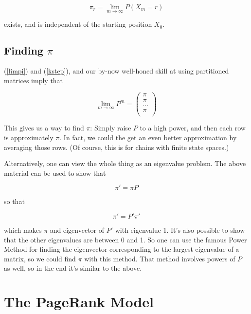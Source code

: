 \begin{equation}
\label{limpi}
\pi_r = \lim_{m \rightarrow \infty} P(X_m = r)
\end{equation}

exists, and is independent of the starting position $X_0$.

\subsection{Finding $\pi$}

(\ref{limpi}) and (\ref{kstep}), and our by-now well-honed skill at
using partitioned matrices imply that 

\begin{equation}
\lim_{m \rightarrow \infty} P^m = 
\left (
\begin{array}{r}
\pi \\
\pi \\
... \\
\pi \\
\end{array}
\right )
\end{equation}

This gives us a way to find $\pi$:  Simply raise $P$ to a high power,
and then each row is approximately $\pi$.  In fact, we could the get an
even better approximation by averaging those rows.  (Of course, this is
for chains with finite state spaces.)

Alternatively, one can view the whole thing as an eigenvalue problem.
The above material can be used to show that

\begin{equation}
\pi' = \pi P
\end{equation}

so that 

\begin{equation}
\pi' = P' \pi' 
\end{equation}

which makes $\pi$ and eigenvector of $P'$ with eigenvalue 1.  It's also
possible to show that the other eigenvalues are between 0 and 1.  So one
can use the famous Power Method for finding the eigenvector
corresponding to the largest eigenvalue of a matrix, so we could
find $\pi$ with this method.  That method involves powers of
$P$ as well, so in the end it's similar to the above.

\section{The PageRank Model}

